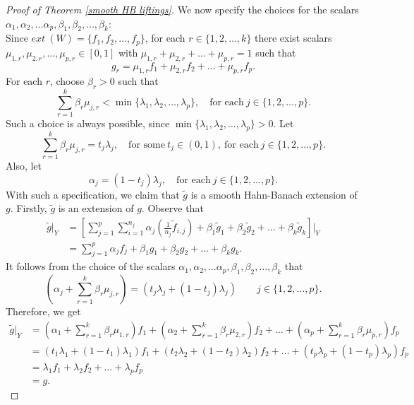 \documentclass{amsart}
\theoremstyle{definition}
\theoremstyle{remark}
\numberwithin{equation}{section}
\begin{document}
\begin{proof}[Proof of Theorem \ref{smooth HB liftings}]
\noindent We now specify the choices for the scalars $\alpha_1, \alpha_2,\dots \alpha_p, \beta_{1}, \beta_{2}, \dots, \beta_k$:\\

\noindent Since $ext~(W)=\{f_1,f_2,\dots,f_p\}$, for each $r\in \{1,2,\dots, k\}$ there exist scalars $\mu_{1,r},\mu_{2,r}, \dots, \mu_{p,r}\in [0,1]$ with $\mu_{1,r}+\mu_{2,r}+ \dots +\mu_{p,r}=1$ such that
\[
g_{r}=\mu_{1,r}f_1+\mu_{2,r}f_2+ \dots +\mu_{p,r}f_p.
\]
For each $r$, choose $\beta_{r}>0$ such that
\[
\sum_{r=1}^{k}\beta_{r}\mu_{j,r}<\min\{\lambda_1,\lambda_2,\dots, \lambda_p\}, \quad \text{for each}~j\in \{1,2,\dots, p\}.
\]
Such a choice is always possible, since $\min\{\lambda_1,\lambda_2,\dots, \lambda_p\}>0$. Let
\[
\sum_{r=1}^{k}\beta_{r}\mu_{j,r}=t_j\lambda_j,\quad \text{for some}~t_j\in (0,1),~\text{for each}~j\in \{1,2,\dots, p\}.
\]
Also, let
\[
\alpha_j=(1-t_j)\lambda_j, \quad \text{for each}~j\in \{1,2,\dots, p\}.
\]
With such a specification, we claim that $\widetilde{g}$ is a smooth Hahn-Banach extension of $g$. Firstly, $\widetilde{g}$ is an extension of $g$. Observe that
\begin{align*}
\widetilde{g}\lvert_Y & = \left[\sum_{j=1}^p\sum_{i=1}^{n_j}\alpha_j(\frac{1}{n_j}\widetilde{f}_{i,j})+\beta_{1}\widetilde{g}_{1}+\beta_{2}\widetilde{g}_{2}+\dots+\beta_{k}\widetilde{g}_k\right]\Bigg\lvert_Y\\
& = \sum_{j=1}^p\alpha_jf_j+\beta_{1}g_{1}+\beta_{2}g_{2}+\dots+\beta_{k}g_k.
\end{align*}
It follows from the choice of the scalars $\alpha_1, \alpha_2,\dots \alpha_p, \beta_{1}, \beta_{2}, \dots, \beta_k$ that
\[
(\alpha_j+\sum_{r=1}^{k}\beta_{r}\mu_{j,r}) = (t_j\lambda_j+(1-t_j)\lambda_j) \qquad j\in \{1,2,\dots,p\}.
\]
Therefore, we get
\begin{align*}
\widetilde{g}\lvert_Y & = (\alpha_1+\sum_{r=1}^{k}\beta_{r}\mu_{1,r})f_1+(\alpha_2+\sum_{r=1}^{k}\beta_{r}\mu_{2,r})f_2+\dots+(\alpha_p+\sum_{r=1}^{k}\beta_{r}\mu_{p,r})f_p\\
& = (t_1\lambda_1+(1-t_1)\lambda_1)f_1+(t_2\lambda_2+(1-t_2)\lambda_2)f_2+\dots+(t_p\lambda_p+(1-t_p)\lambda_p)f_p\\
& = \lambda_1f_1+\lambda_2f_2+\dots+\lambda_pf_p\\
& = g.
\end{align*}

\medskip



\end{proof}
\end{document}
